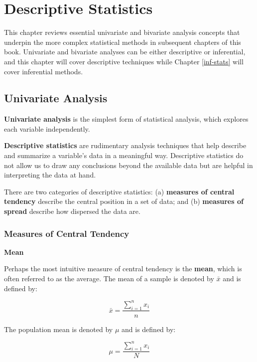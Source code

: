 \documentclass[
]{book}
\begin{document}
\hypertarget{desc-stats}{%
\chapter{Descriptive Statistics}\label{desc-stats}}

This chapter reviews essential univariate and bivariate analysis concepts that underpin the more complex statistical methods in subsequent chapters of this book. Univariate and bivariate analyses can be either descriptive or inferential, and this chapter will cover descriptive techniques while Chapter \ref{inf-stats} will cover inferential methods.

\hypertarget{univariate-analysis}{%
\section{Univariate Analysis}\label{univariate-analysis}}

\textbf{Univariate analysis} is the simplest form of statistical analysis, which explores each variable independently.

\textbf{Descriptive statistics} are rudimentary analysis techniques that help describe and summarize a variable's data in a meaningful way. Descriptive statistics do not allow us to draw any conclusions beyond the available data but are helpful in interpreting the data at hand.

There are two categories of descriptive statistics: (a) \textbf{measures of central tendency} describe the central position in a set of data; and (b) \textbf{measures of spread} describe how dispersed the data are.

\hypertarget{measures-of-central-tendency}{%
\subsection{Measures of Central Tendency}\label{measures-of-central-tendency}}

\textbf{Mean}

Perhaps the most intuitive measure of central tendency is the \textbf{mean}, which is often referred to as the average. The mean of a sample is denoted by \(\bar{x}\) and is defined by:

\[ \bar{x} = \frac{\displaystyle\sum_{i=1}^{n} x_{i}}{n} \]

The population mean is denoted by \(\mu\) and is defined by:

\[ \mu = \frac{\displaystyle\sum_{i=1}^{n} x_{i}}{N} \]
\end{document}
